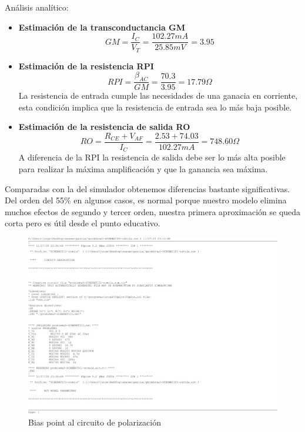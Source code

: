 Análisis analítico:
\begin{itemize}
\item \textbf{Estimación de la transconductancia GM}
  \[GM = \dfrac{I_C}{V_T} = \dfrac{102.27 mA}{25.85 mV} = 3.95\]
\item \textbf{Estimación de la resistencia RPI}
  \[RPI = \dfrac{\beta_{AC}}{GM} = \dfrac{70.3}{3.95} = 17.79 \Omega\]
  La resistencia de entrada cumple las necesidades de una ganacia en
  corriente, esta condición implica que la resistencia de entrada sea
  lo más baja posible.
\item \textbf{Estimación de la resistencia de salida RO}
  \[RO = \dfrac{R_{CE}+V_{AF}}{I_C} = \dfrac{2.53+74.03}{102.27 mA} =
    748.60 \Omega \]
  A diferencia de la RPI la resistencia de salida debe ser lo más alta
  posible para realizar la máxima amplificación y que la ganancia sea máxima.
\end{itemize}

Comparadas con la del simulador obtenemos diferencias bastante
significativas. Del orden del 55\% en algunos casos, es normal porque
nuestro modelo elimina muchos efectos de segundo y tercer orden,
nuestra primera aproximación se queda corta pero es útil desde el
punto educativo.

  \begin{figure}[H]
    \centering  
    \includegraphics[scale=1,page=3,clip, trim=0cm 10cm 23cm 5cm]{images/output.pdf}
    \caption{Bias point al circuito de polarización}
  \end{figure}
  
